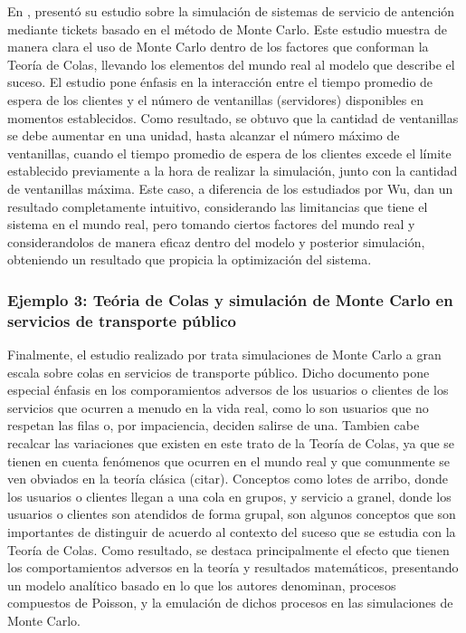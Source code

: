 \noindent En \citeyear{yin2010}, \citeauthor{yin2010} presentó su estudio sobre la simulación de sistemas de servicio de antención mediante tickets basado en el método de Monte Carlo. Este estudio muestra de manera clara el uso de Monte Carlo dentro de los factores que conforman la Teoría de Colas, llevando los elementos del mundo real al modelo que describe el suceso. El estudio pone énfasis en la interacción entre el tiempo promedio de espera de los clientes y el número de ventanillas (servidores) disponibles en momentos establecidos.
\newline \newline
Como resultado, se obtuvo que la cantidad de ventanillas se debe aumentar en una unidad, hasta alcanzar el número máximo de ventanillas, cuando el tiempo promedio de espera de los clientes excede el límite establecido previamente a la hora de realizar la simulación, junto con la cantidad de ventanillas máxima. Este caso, a diferencia de los estudiados por Wu, dan un resultado completamente intuitivo, considerando las limitancias que tiene el sistema en el mundo real, pero tomando ciertos factores del mundo real y considerandolos de manera eficaz dentro del modelo y posterior simulación, obteniendo un resultado que propicia la optimización del sistema.

\subsubsection{Ejemplo 3: Teória de Colas y simulación de Monte Carlo en servicios de transporte público}

\noindent Finalmente, el estudio realizado por \citep{wang2014} trata simulaciones de Monte Carlo a gran escala sobre colas en servicios de transporte público. Dicho documento pone especial énfasis en los comporamientos adversos de los usuarios o clientes de los servicios que ocurren a menudo en la vida real, como lo son usuarios que no respetan las filas o, por impaciencia, deciden salirse de una. Tambien cabe recalcar las variaciones que existen en este trato de la Teoría de Colas, ya que se tienen en cuenta fenómenos que ocurren en el mundo real y que comunmente se ven obviados en la teoría clásica (citar). Conceptos como lotes de arribo, donde los usuarios o clientes llegan a una cola en grupos, y servicio a granel, donde los usuarios o clientes son atendidos de forma grupal, son algunos conceptos que son importantes de distinguir de acuerdo al contexto del suceso que se estudia con la Teoría de Colas. 
\newline \newline
Como resultado, se destaca principalmente el efecto que tienen los comportamientos adversos en la teoría y resultados matemáticos, presentando un modelo analítico basado en lo que los autores denominan, procesos compuestos de Poisson, y la emulación de dichos procesos en las simulaciones de Monte Carlo.

